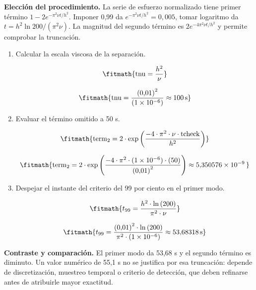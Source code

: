 \noindent\textbf{Elección del procedimiento.} La serie de esfuerzo normalizado tiene primer término $1-2e^{-\pi^2\nu t/h^2}$. Imponer 0,99 da $e^{-\pi^2\nu t/h^2}=0{,}005$, tomar logaritmo da $t=h^2\ln200/(\pi^2\nu)$. La magnitud del segundo término es $2e^{-4\pi^2\nu t/h^2}$ y permite comprobar la truncación.

\begin{enumerate}

\item Calcular la escala viscosa de la separación.

\[\fitmath{\mathrm{tnu}=\frac{{h}^{2}}{\nu}}\]

\[\fitmath{\mathrm{tnu}=\frac{{(0{,}01)}^{2}}{(1\times10^{-6})}\approx 100\,\mathrm{s}}\]

\item Evaluar el término omitido a 50 s.

\[\fitmath{\mathrm{term}_{2}=2\cdot \exp\left(\frac{-4\cdot {\pi}^{2}\cdot \nu\cdot \mathrm{tcheck}}{{h}^{2}}\right)}\]

\[\fitmath{\mathrm{term}_{2}=2\cdot \exp\left(\frac{-4\cdot {\pi}^{2}\cdot (1\times10^{-6})\cdot (50)}{{(0{,}01)}^{2}}\right)\approx 5{,}350576\times10^{-9}\,}\]

\item Despejar el instante del criterio del 99 por ciento en el primer modo.

\[\fitmath{t_{99}=\frac{{h}^{2}\cdot \ln\left(200\right)}{{\pi}^{2}\cdot \nu}}\]

\[\fitmath{t_{99}=\frac{{(0{,}01)}^{2}\cdot \ln\left(200\right)}{{\pi}^{2}\cdot (1\times10^{-6})}\approx 53{,}68318\,\mathrm{s}}\]

\end{enumerate}

\noindent\textbf{Contraste y comparación.} El primer modo da 53,68 s y el segundo término es diminuto. Un valor numérico de 55,1 s no se justifica por esa truncación: depende de discretización, muestreo temporal o criterio de detección, que deben refinarse antes de atribuirle mayor exactitud.
